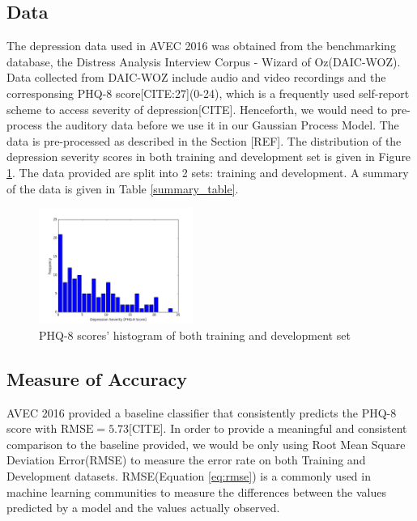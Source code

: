 \documentclass{article}
\begin{document}
	\subsection{Data}
	The depression data used in AVEC 2016 was obtained from the benchmarking database, the Distress Analysis Interview Corpus - Wizard of Oz(DAIC-WOZ). Data collected from DAIC-WOZ include audio and video recordings and the corresponsing PHQ-8 score[CITE:27](0-24), which is a frequently used self-report scheme to access severity of depression[CITE]. Henceforth, we would need to pre-process the auditory data before we use it in our Gaussian Process Model. The data is pre-processed as described in the Section [REF]. The distribution of the depression severity scores in both training and development set is given in Figure \ref{histogram_phq8}. The data provided are split into 2 sets: training and development. A summary of the data is given in Table \ref{summary_table}.
	\begin{figure}
  \includegraphics[width=0.45\textwidth]{histogram_phq8}
  \caption{PHQ-8 scores' histogram of both training and development set}
  \label{histogram_phq8}
 \end{figure}
 \subsection{Measure of Accuracy}
 AVEC 2016 provided a baseline classifier that consistently predicts the PHQ-8 score with $\text{RMSE}=5.73$[CITE]. In order to provide a meaningful and consistent comparison to the baseline provided, we would be only using Root Mean Square Deviation Error(RMSE) to measure the error rate on both Training and Development datasets. RMSE(Equation \ref{eq:rmse}) is a commonly used in machine learning communities to measure the differences between the values predicted by a model and the values actually observed. 
\end{document}
